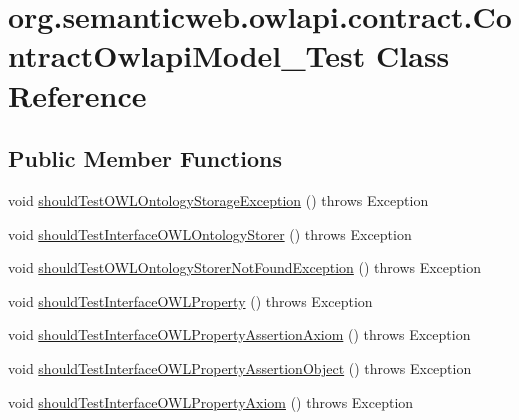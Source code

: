\hypertarget{classorg_1_1semanticweb_1_1owlapi_1_1contract_1_1_contract_owlapi_model__4_test}{\section{org.\-semanticweb.\-owlapi.\-contract.\-Contract\-Owlapi\-Model\-\_\-Test Class Reference}
\label{classorg_1_1semanticweb_1_1owlapi_1_1contract_1_1_contract_owlapi_model__4_test}
}
\subsection*{Public Member Functions}
\begin{DoxyCompactItemize}
\item 
void \hyperlink{classorg_1_1semanticweb_1_1owlapi_1_1contract_1_1_contract_owlapi_model__4_test_af1609d9cf1672a456f914461ee136d4e}{should\-Test\-O\-W\-L\-Ontology\-Storage\-Exception} ()  throws Exception 
\item 
void \hyperlink{classorg_1_1semanticweb_1_1owlapi_1_1contract_1_1_contract_owlapi_model__4_test_a89b32fac0a5da21fc879cfaa1ac1fe0e}{should\-Test\-Interface\-O\-W\-L\-Ontology\-Storer} ()  throws Exception 
\item 
void \hyperlink{classorg_1_1semanticweb_1_1owlapi_1_1contract_1_1_contract_owlapi_model__4_test_a8839a6d632b5a58ef17ee0979ed1c18c}{should\-Test\-O\-W\-L\-Ontology\-Storer\-Not\-Found\-Exception} ()  throws Exception 
\item 
void \hyperlink{classorg_1_1semanticweb_1_1owlapi_1_1contract_1_1_contract_owlapi_model__4_test_a5577f2bad7fb60cebf4383059c5f2770}{should\-Test\-Interface\-O\-W\-L\-Property} ()  throws Exception 
\item 
void \hyperlink{classorg_1_1semanticweb_1_1owlapi_1_1contract_1_1_contract_owlapi_model__4_test_ac7a5d9feee14b824728ecde8d58959a3}{should\-Test\-Interface\-O\-W\-L\-Property\-Assertion\-Axiom} ()  throws Exception 
\item 
void \hyperlink{classorg_1_1semanticweb_1_1owlapi_1_1contract_1_1_contract_owlapi_model__4_test_ac9a87a1edfa14177009e12b8c56ce967}{should\-Test\-Interface\-O\-W\-L\-Property\-Assertion\-Object} ()  throws Exception 
\item 
void \hyperlink{classorg_1_1semanticweb_1_1owlapi_1_1contract_1_1_contract_owlapi_model__4_test_ad26cb980dbba91dad26b0b1354c2c3f4}{should\-Test\-Interface\-O\-W\-L\-Property\-Axiom} ()  throws Exception 

\end{DoxyCompactItemize}
